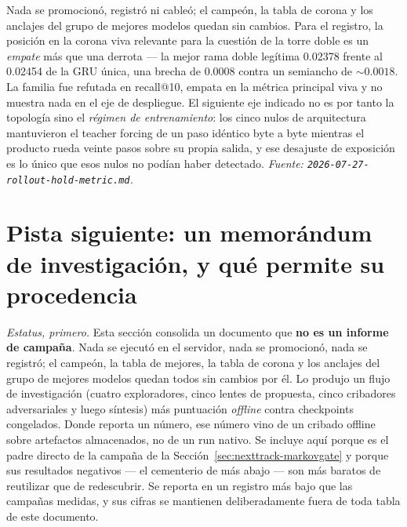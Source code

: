 \documentclass[11pt]{article}
\begin{document}
Nada se promocionó, registró ni cableó; el campeón, la tabla de corona y los
anclajes del grupo de mejores modelos quedan sin cambios. Para el registro, la
posición en la corona viva relevante para la cuestión de la torre doble es un
\emph{empate} más que una derrota --- la mejor rama doble legítima \num{0.02378}
frente al \num{0.02454} de la GRU única, una brecha de \num{0.0008} contra un
semiancho de ${\sim}\num{0.0018}$. La familia fue refutada en recall@10, empata en
la métrica principal viva y no muestra nada en el eje de despliegue. El siguiente
eje indicado no es por tanto la topología sino el \emph{régimen de entrenamiento}:
los cinco nulos de arquitectura mantuvieron el teacher forcing de un paso idéntico
byte a byte mientras el producto rueda veinte pasos sobre su propia salida, y ese
desajuste de exposición es lo único que esos nulos no podían haber detectado.
\emph{Fuente: \texttt{2026-07-27-rollout-hold-metric.md}.}

\section{Pista siguiente: un memorándum de investigación, y qué permite su procedencia}
\label{sec:nexttrack-memo}
\emph{Estatus, primero.} Esta sección consolida un documento que \textbf{no es un
informe de campaña}. Nada se ejecutó en el servidor, nada se promocionó, nada se
registró; el campeón, la tabla de mejores, la tabla de corona y los anclajes del
grupo de mejores modelos quedan todos sin cambios por él. Lo produjo un flujo de
investigación (cuatro exploradores, cinco lentes de propuesta, cinco cribadores
adversariales y luego síntesis) más puntuación \emph{offline} contra checkpoints
congelados. Donde reporta un número, ese número vino de un cribado offline sobre
artefactos almacenados, no de un run nativo. Se incluye aquí porque es el padre
directo de la campaña de la Sección~\ref{sec:nexttrack-markovgate} y porque sus resultados
negativos --- el cementerio de más abajo --- son más baratos de reutilizar que de
redescubrir. Se reporta en un registro más bajo que las campañas medidas, y sus
cifras se mantienen deliberadamente fuera de toda tabla de este documento.
\end{document}

